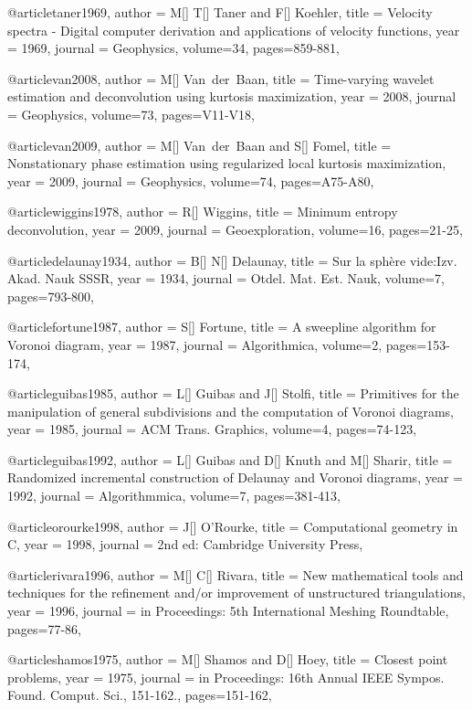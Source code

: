 @article{taner1969,
  author =	 {M[] T[] Taner and F[] Koehler},
  title =	 {Velocity spectra - Digital computer derivation and applications of velocity functions},
  year =	 1969,
  journal =	 {Geophysics},
  volume={34},
 pages=859-881,
}

@article{van2008,
  author =	 {M[] Van~der~Baan},
  title =	 {Time-varying wavelet estimation and deconvolution using kurtosis maximization},
  year =	 2008,
  journal =	 {Geophysics},
  volume={73},
 pages=V11-V18,
}

@article{van2009,
  author =	 {M[] Van~der~Baan and S[] Fomel},
  title =	 {Nonstationary phase estimation using regularized local kurtosis maximization},
  year =	 2009,
  journal =	 {Geophysics},
  volume={74},
 pages=A75-A80,
}

@article{wiggins1978,
  author =	 {R[] Wiggins},
  title =	 {Minimum entropy deconvolution},
  year =	 2009,
  journal =	 {Geoexploration},
  volume={16},
 pages=21-25,
}

@article{delaunay1934,
  author =	 {B[] N[] Delaunay},
  title =	 {Sur la sph\`{e}re vide:Izv. Akad. Nauk SSSR},
  year =	 1934,
  journal =	 {Otdel. Mat. Est. Nauk},
  volume={7},
 pages=793-800,
}

@article{fortune1987,
  author =	 {S[] Fortune},
  title =	 {A sweepline algorithm for Voronoi diagram},
  year =	 1987,
  journal =	 {Algorithmica},
  volume={2},
 pages=153-174,
}

@article{guibas1985,
  author =	 {L[] Guibas and J[] Stolfi},
  title =	 {Primitives for the manipulation of general subdivisions and the computation of Voronoi diagrams},
  year =	 1985,
  journal =	 {ACM Trans. Graphics},
  volume={4},
 pages=74-123,
}

@article{guibas1992,
  author =	 {L[] Guibas and D[] Knuth and M[] Sharir},
  title =	 {Randomized incremental construction of Delaunay and Voronoi diagrams},
  year =	 1992,
  journal =	 {Algorithmmica},
  volume={7},
 pages=381-413,
}

@article{orourke1998,
  author =	 {J[] O'Rourke},
  title =	 {Computational geometry in C},
  year =	 1998,
  journal =	 {2nd ed: Cambridge University Press},
}

@article{rivara1996,
  author =	 {M[] C[] Rivara},
  title =	 {New mathematical tools and techniques for the refinement and/or improvement of unstructured triangulations},
  year =	 1996,
  journal =	 {in Proceedings: 5th International Meshing Roundtable},
 pages=77-86,
}

@article{shamos1975,
  author =	 {M[] Shamos and D[] Hoey},
  title =	 {Closest point problems},
  year =	 1975,
  journal =	 {in Proceedings: 16th Annual IEEE Sympos. Found. Comput. Sci., 151-162.},
  pages=151-162,
}

